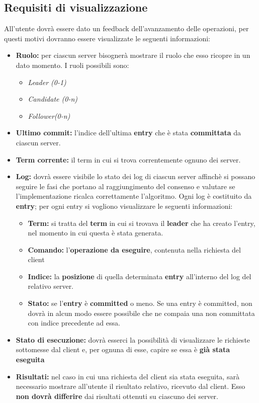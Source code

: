 	\subsection{Requisiti di visualizzazione}
	All'utente dovrà essere dato un feedback dell'avanzamento delle operazioni, per questi motivi dovranno essere visualizzate le seguenti informazioni: 
		\begin{itemize}
			\item \textbf{Ruolo:} per ciascun server bisognerà mostrare il ruolo che esso ricopre in un dato momento. I ruoli possibili sono:
				\begin{itemize}
					\item \emph{Leader (0-1)}
					\item \emph{Candidate (0-n)}
					\item \emph{Follower(0-n)}
				\end{itemize}
			\item \textbf{Ultimo commit:} l'indice dell'ultima \textbf{entry} che è stata \textbf{committata} da ciascun server.
			\item \textbf{Term corrente:} il term in cui si trova correntemente ognuno dei server.
			\item \textbf{Log:} dovrà essere visibile lo stato dei log di ciascun server affinchè si possano seguire le fasi che portano al raggiungimento del consenso e valutare se l'implementazione ricalca correttamente l'algoritmo. Ogni log è costituito da \textbf{entry}; per ogni entry si vogliono visualizzare le seguenti informazioni:
				\begin{itemize}
					\item \textbf{Term:} si tratta del \textbf{term} in cui si trovava il \textbf{leader} che ha creato l'entry, nel momento in cui questa è stata generata. 
					\item \textbf{Comando:} l'\textbf{operazione da eseguire}, contenuta nella richiesta del client 
					\item \textbf{Indice:} la \textbf{posizione} di quella determinata \textbf{entry} all'interno del log del relativo server.
					\item \textbf{Stato:} se l'\textbf{entry} è \textbf{committed} o meno. Se una entry è committed, non dovrà in alcun modo essere possibile che ne compaia una non committata con indice precedente ad essa.
				\end{itemize} 
			\item \textbf{Stato di esecuzione:} dovrà esserci la possibilità di visualizzare le richieste sottomesse dal client e, per ognuna di esse, capire se essa è \textbf{già stata eseguita}
			\item \textbf{Risultati:} nel caso in cui una richiesta del client sia stata eseguita, sarà necessario mostrare all'utente il risultato relativo, ricevuto dal client. Esso \textbf{non dovrà differire} dai risultati ottenuti su ciascuno dei server.
		\end{itemize}

